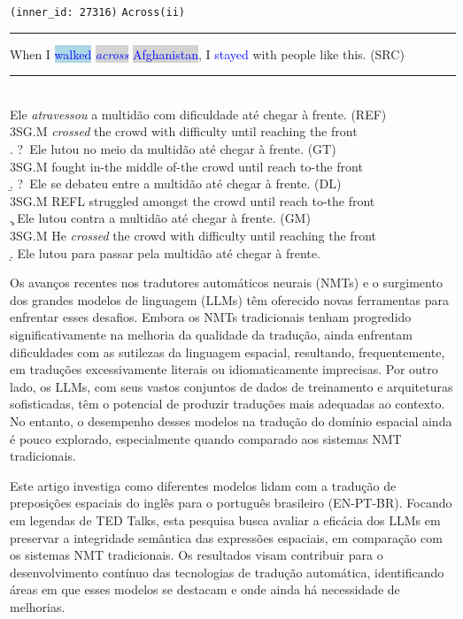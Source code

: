 \documentclass[a4paper, twocolumn, 11pt, twoside]{article}
\begin{document}
\ex \texttt{(inner\_id: 27316)} \hfill \texttt{Across(ii)} \\[0.3ex]
\noindent\rule{\linewidth}{0.9pt}
When I \colorbox{lightblue}{\textcolor{blue}{walked}} \colorbox{lightgray}{\textcolor{blue}{\emph{across}}} \colorbox{lightgray}{\textcolor{blue}{Afghanistan}}, I \textcolor{blue}{stayed} with people like this. (SRC) \label{ex:ex-1} \\[-0.3ex]
\noindent\rule{\linewidth}{0.3pt} \\ 
Ele \textit{atravessou} a multidão com dificuldade até chegar à frente.  (REF) \\ 
\gll 3SG.M \textit{crossed} the crowd with difficulty until reaching the front \\
\medskip
\a. ?~Ele lutou no meio da multidão até chegar à frente. (GT) \\ 
\gll 3SG.M fought in-the middle of-the crowd until reach to-the front \\
\medskip
\b. ?~Ele se debateu entre a multidão até chegar à frente. (DL) \\ 
\gll 3SG.M REFL struggled amongst the crowd until reach to-the front \\
\medskip
\c. Ele lutou contra a multidão até chegar à frente. (GM) \\
\gll 3SG.M He \textit{crossed} the crowd with difficulty until reaching the front \\
\d. Ele lutou para passar pela multidão até chegar à frente.
\normalsize


Os avanços recentes nos tradutores automáticos neurais (NMTs) e o surgimento dos grandes modelos de linguagem (LLMs) têm oferecido novas ferramentas para enfrentar esses desafios. Embora os NMTs tradicionais tenham progredido significativamente na melhoria da qualidade da tradução, ainda enfrentam dificuldades com as sutilezas da linguagem espacial, resultando, frequentemente, em traduções excessivamente literais ou idiomaticamente imprecisas. Por outro lado, os LLMs, com seus vastos conjuntos de dados de treinamento e arquiteturas sofisticadas, têm o potencial de produzir traduções mais adequadas ao contexto. No entanto, o desempenho desses modelos na tradução do domínio espacial ainda é pouco explorado, especialmente quando comparado aos sistemas NMT tradicionais.

Este artigo investiga como diferentes modelos lidam com a tradução de preposições espaciais do inglês para o português brasileiro (EN-PT-BR). Focando em legendas de TED Talks, esta pesquisa busca avaliar a eficácia dos LLMs em preservar a integridade semântica das expressões espaciais, em comparação com os sistemas NMT tradicionais. Os resultados visam contribuir para o desenvolvimento contínuo das tecnologias de tradução automática, identificando áreas em que esses modelos se destacam e onde ainda há necessidade de melhorias.
\end{document}
